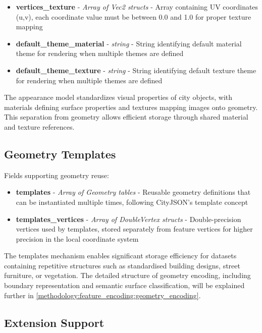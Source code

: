 \begin{itemize}
\begin{itemize}
      \item \textbf{vertices\_texture} - \textit{Array of Vec2 structs} - Array containing UV coordinates (u,v), each coordinate value must be between 0.0 and 1.0 for proper texture mapping

      \item \textbf{default\_theme\_material} - \textit{string} - String identifying default material theme for rendering when multiple themes are defined
      \item \textbf{default\_theme\_texture} - \textit{string} - String identifying default texture theme for rendering when multiple themes are defined
    \end{itemize}
\end{itemize}

The appearance model standardizes visual properties of city objects, with materials defining surface properties and textures mapping images onto geometry. This separation from geometry allows efficient storage through shared material and texture references.

\subsection{Geometry Templates}
\label{methodology:header:geometry_templates}

Fields supporting geometry reuse:

\begin{itemize}
  \item \textbf{templates} - \textit{Array of Geometry tables} - Reusable geometry definitions that can be instantiated multiple times, following CityJSON's template concept \citep{cityjson_spec}

  \item \textbf{templates\_vertices} - \textit{Array of DoubleVertex structs} - Double-precision vertices used by templates, stored separately from feature vertices for higher precision in the local coordinate system \citep{cityjson_spec}
\end{itemize}

The templates mechanism enables significant storage efficiency for datasets containing repetitive structures such as standardised building designs, street furniture, or vegetation. The detailed structure of geometry encoding, including boundary representation and semantic surface classification, will be explained further in \autoref{methodology:feature_encoding:geometry_encoding}.

\subsection{Extension Support}
\label{methodology:header:extensions}

